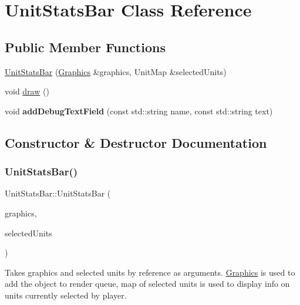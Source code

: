 \hypertarget{class_unit_stats_bar}{}\section{Unit\+Stats\+Bar Class Reference}
\label{class_unit_stats_bar}
\subsection*{Public Member Functions}
\begin{DoxyCompactItemize}
\item 
\hyperlink{class_unit_stats_bar_a77a624d15a22bb8e836405233b5a374f}{Unit\+Stats\+Bar} (\hyperlink{class_graphics}{Graphics} \&graphics, Unit\+Map \&selected\+Units)
\item 
void \hyperlink{class_unit_stats_bar_a45e9422bfefe76358391e5abc5e848e7}{draw} ()
\item 
\mbox{\label{class_unit_stats_bar_a31ce11a7da0c219f7e6b48c6109f4cde}} 
void {\bfseries add\+Debug\+Text\+Field} (const std\+::string name, const std\+::string text)
\end{DoxyCompactItemize}


\subsection{Constructor \& Destructor Documentation}
\mbox{\label{class_unit_stats_bar_a77a624d15a22bb8e836405233b5a374f}} 
\subsubsection{\texorpdfstring{Unit\+Stats\+Bar()}{UnitStatsBar()}}
{\footnotesize\ttfamily Unit\+Stats\+Bar\+::\+Unit\+Stats\+Bar (\begin{DoxyParamCaption}\item[{\hyperlink{class_graphics}{Graphics} \&}]{graphics,  }\item[{Unit\+Map \&}]{selected\+Units }\end{DoxyParamCaption})}

Takes graphics and selected units by reference as arguments. \hyperlink{class_graphics}{Graphics} is used to add the object to render queue, map of selected units is used to display info on units currently selected by player. 

